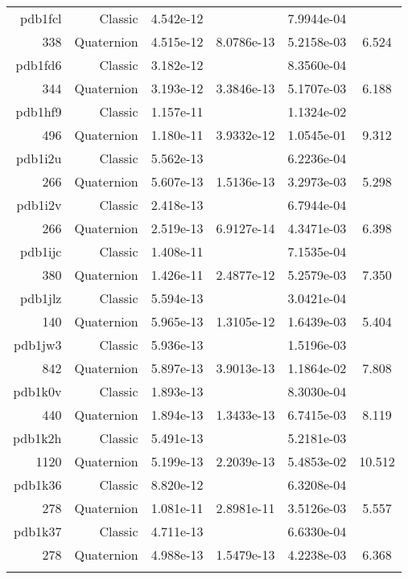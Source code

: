 \begin{xltabular}{\textwidth}{r|rS[table-format=1.3e+2]S[table-format=1.4e+2]S[table-format=1.4e+2]S[table-format=-1.3]}
pdb1fcl & Classic & 4.542e-12 &  & 7.9944e-04 & \\
338 & Quaternion & 4.515e-12 & 8.0786e-13 & 5.2158e-03 & 6.524\\  \addlinespace
pdb1fd6 & Classic & 3.182e-12 &  & 8.3560e-04 & \\
344 & Quaternion & 3.193e-12 & 3.3846e-13 & 5.1707e-03 & 6.188\\  \addlinespace
pdb1hf9 & Classic & 1.157e-11 &  & 1.1324e-02 & \\
496 & Quaternion & 1.180e-11 & 3.9332e-12 & 1.0545e-01 & 9.312\\  \addlinespace
pdb1i2u & Classic & 5.562e-13 &  & 6.2236e-04 & \\
266 & Quaternion & 5.607e-13 & 1.5136e-13 & 3.2973e-03 & 5.298\\  \addlinespace
pdb1i2v & Classic & 2.418e-13 &  & 6.7944e-04 & \\
266 & Quaternion & 2.519e-13 & 6.9127e-14 & 4.3471e-03 & 6.398\\  \addlinespace
pdb1ijc & Classic & 1.408e-11 &  & 7.1535e-04 & \\
380 & Quaternion & 1.426e-11 & 2.4877e-12 & 5.2579e-03 & 7.350\\  \addlinespace
pdb1jlz & Classic & 5.594e-13 &  & 3.0421e-04 & \\
140 & Quaternion & 5.965e-13 & 1.3105e-12 & 1.6439e-03 & 5.404\\  \addlinespace
pdb1jw3 & Classic & 5.936e-13 &  & 1.5196e-03 & \\
842 & Quaternion & 5.897e-13 & 3.9013e-13 & 1.1864e-02 & 7.808\\  \addlinespace
pdb1k0v & Classic & 1.893e-13 &  & 8.3030e-04 & \\
440 & Quaternion & 1.894e-13 & 1.3433e-13 & 6.7415e-03 & 8.119\\  \addlinespace
pdb1k2h & Classic & 5.491e-13 &  & 5.2181e-03 & \\
1120 & Quaternion & 5.199e-13 & 2.2039e-13 & 5.4853e-02 & 10.512\\  \addlinespace
pdb1k36 & Classic & 8.820e-12 &  & 6.3208e-04 & \\
278 & Quaternion & 1.081e-11 & 2.8981e-11 & 3.5126e-03 & 5.557\\  \addlinespace
pdb1k37 & Classic & 4.711e-13 &  & 6.6330e-04 & \\
278 & Quaternion & 4.988e-13 & 1.5479e-13 & 4.2238e-03 & 6.368\\  \addlinespace

\end{xltabular}
